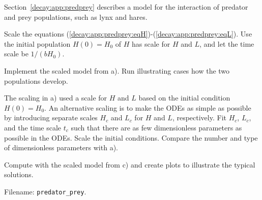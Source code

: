 \documentclass[graybox,sectrefs,envcountresetchap,open=right,final]{svmonodo}
\makeatletter
\newenvironment{doconceexercise}{}{}
\newcounter{doconceexercisecounter}%
\newcommand\listofexercises{
\chapter*{List of Exercises, Problems, and Projects
          \@mkboth{List of Exercises, Problems, and Projects}{List of Exercises, Problems, and Projects}}
\markboth{List of Exercises, Problems, and Projects}{List of Exercises, Problems, and Projects}
\@starttoc{loe}
}
\makeatother
\begin{document}
\begin{doconceexercise}

                
\label{decay:app:exer:predprey}

Section~\ref{decay:app:predprey} describes a model for the
interaction of predator and prey populations, such as lynx and hares.

Scale the equations (\ref{decay:app:predprey:eqH})-(\ref{decay:app:predprey:eqL}).
Use the initial population $H(0)=H_0$ of $H$ has scale for $H$ and $L$, and
let the time scale be $1/(bH_0)$.



Implement the scaled model from a). Run illustrating cases how the
two populations develop.



The scaling in a) used a scale for $H$ and $L$ based on the
initial condition $H(0)=H_0$. An alternative scaling is to make
the ODEs as simple as possible by introducing separate scales
$H_c$ and $L_c$ for $H$ and $L$, respectively. Fit $H_c$,
$L_c$, and the time scale $t_c$ such that there are as few
dimensionless parameters as possible in the ODEs. Scale the initial
conditions. Compare the number and type of dimensionless parameters
with a).



Compute with the scaled model from c) and create plots to illustrate
the typical solutions.



\noindent Filename: \Verb!predator_prey!.

\end{doconceexercise}
\end{document}
